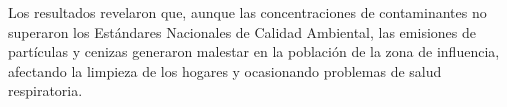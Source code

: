 Los resultados revelaron que, aunque las concentraciones de contaminantes no superaron los Estándares Nacionales de Calidad Ambiental, las emisiones de partículas y cenizas generaron malestar en la población de la zona de influencia, afectando la limpieza de los hogares y ocasionando problemas de salud respiratoria​.


